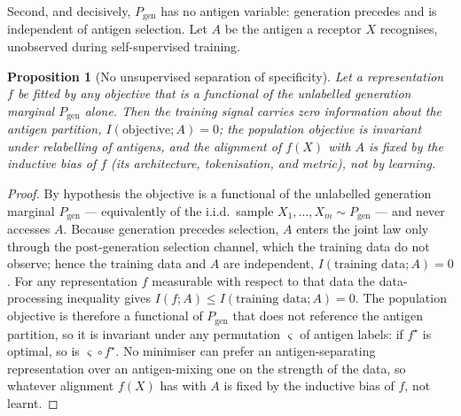 \documentclass[11pt]{article}
\theoremstyle{oldplain}
\newtheorem{proposition}{Proposition}
\theoremstyle{oldrem}
\newcommand{\Pgen}{P_{\mathrm{gen}}}
\begin{document}
Second, and decisively, $\Pgen$ has no antigen variable: generation precedes and is independent of antigen
selection. Let $A$ be the antigen a receptor $X$ recognises, unobserved during self-supervised training.

\begin{proposition}[No unsupervised separation of specificity]\label{prop:nofreelunch}
Let a representation $f$ be fitted by any objective that is a functional of the unlabelled generation
marginal $\Pgen$ alone. Then the training signal carries zero information about the antigen partition,
$I(\text{objective};A)=0$; the population objective is invariant under relabelling of antigens, and the
alignment of $f(X)$ with $A$ is fixed by the inductive bias of $f$ (its architecture, tokenisation, and
metric), not by learning.
\end{proposition}
\begin{proof}
By hypothesis the objective is a functional of the unlabelled generation marginal $\Pgen$ --- equivalently of
the i.i.d.\ sample $X_1,\dots,X_m\sim\Pgen$ --- and never accesses $A$. Because generation precedes selection,
$A$ enters the joint law only through the post-generation selection channel, which the training data do not
observe; hence the training data and $A$ are independent, $I(\text{training data};A)=0$. For any
representation $f$ measurable with respect to that data the data-processing inequality gives
$I(f;A)\le I(\text{training data};A)=0$. The population objective is therefore a functional of $\Pgen$ that
does not reference the antigen partition, so it is invariant under any permutation $\varsigma$ of antigen
labels: if $f^\star$ is optimal, so is $\varsigma\circ f^\star$. No minimiser can prefer an antigen-separating
representation over an antigen-mixing one on the strength of the data, so whatever alignment $f(X)$ has with
$A$ is fixed by the inductive bias of $f$, not learnt.
\end{proof}
\end{document}
